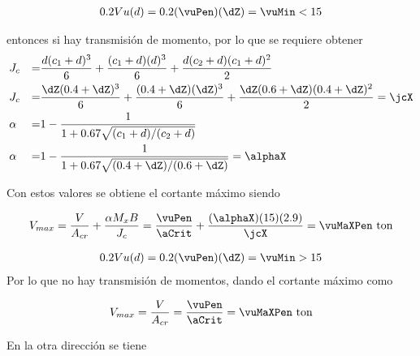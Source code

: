 \documentclass[11pt,a4paper,fleqn]{article}
\begin{document}
	{
	\begin{align*}
		0.2Vu(d)=0.2(\vuPen)(\dZ)=\vuMin<\mxZ 
	\end{align*}

entonces si hay transmisión de momento, por lo que se requiere obtener 
	\begin{align*}
		&J_c&=&\frac{d(c_1+d)^3}{6}+\frac{(c_1+d)(d)^3}{6}+\frac{d(c_2+d)(c_1+d)^2}{2}\\
		&J_c&=&\frac{\dZ(\caZ+\dZ)^3}{6}+\frac{(\caZ+\dZ)(\dZ)^3}{6}+\frac{\dZ(\cbZ+\dZ)(\caZ+\dZ)^2}{2}=\jcX\\
		&\alpha&=&1-\frac{1}{1+0.67\sqrt{(c_1+d)/(c_2+d)}}\\
		&\alpha&=&1-\frac{1}{1+0.67\sqrt{(\caZ+\dZ)/(\cbZ+\dZ)}}=\alphaX
	\end{align*}
	
	Con estos valores se obtiene el cortante máximo siendo
	
	\begin{align*}
		V_{max}=\frac{V}{A_{cr}}+\frac{\alpha M_x B}{J_c}=\frac{\vuPen}{\aCrit}+\frac{(\alphaX)(\mxZ)(\bZ)}{\jcX}=\vuMaXPen \text{ ton}
	\end{align*}
	} 
	{
	\begin{align*}
		0.2Vu(d)=0.2(\vuPen)(\dZ)=\vuMin>\mxZ 
	\end{align*}
	Por lo que no hay transmisión de momentos, dando el cortante máximo como
	
	
	\begin{align*}
		V_{max}=\frac{V}{A_{cr}}=\frac{\vuPen}{\aCrit}=\vuMaXPen \text{ ton}
	\end{align*}
  }

En la otra dirección se tiene
\end{document}
